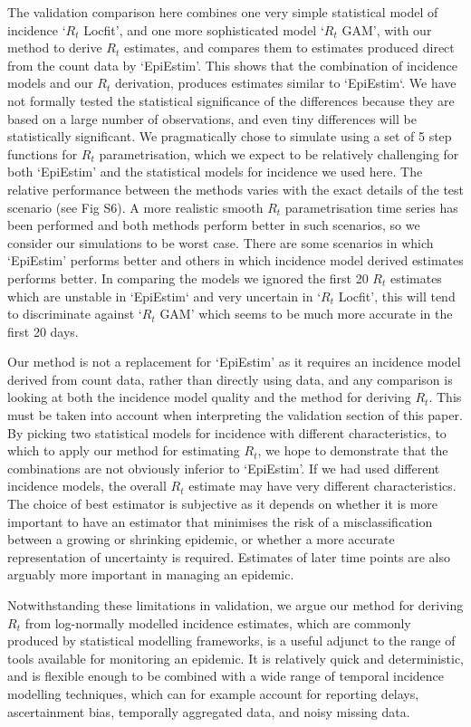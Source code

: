 \documentclass[10pt,letterpaper]{article}
\begin{document}
The validation comparison here combines one very simple statistical model of incidence `$R_t$ Locfit', and one more sophisticated model `$R_t$ GAM', with our method to derive $R_t$ estimates, and compares them to estimates produced direct from the count data by `EpiEstim'. This shows that the combination of incidence models and our $R_t$ derivation, produces estimates similar to `EpiEstim`. We have not formally tested the statistical significance of the differences because they are based on a large number of observations, and even tiny differences will be statistically significant. We pragmatically chose to simulate using a set of 5 step functions for $R_t$ parametrisation, which we expect to be relatively challenging for both `EpiEstim' and the statistical models for incidence we used here. The relative performance between the methods varies with the exact details of the test scenario (see  Fig S6). A more realistic smooth $R_t$ parametrisation time series has been performed and both methods perform better in such scenarios, so we consider our simulations to be worst case. There are some scenarios in which `EpiEstim' performs better and others in which incidence model derived estimates performs better. In comparing the models we ignored the first 20 $R_t$ estimates which are unstable in `EpiEstim` and very uncertain in `$R_t$ Locfit', this will tend to discriminate against `$R_t$ GAM' which seems to be much more accurate in the first 20 days.

Our method is not a replacement for `EpiEstim' as it requires an incidence model derived from count data, rather than directly using data, and any comparison is looking at both the incidence model quality and the method for deriving $R_t$. This must be taken into account when interpreting the validation section of this paper. By picking two statistical models for incidence with different characteristics, to which to apply our method for estimating $R_t$, we hope to demonstrate that the combinations are not obviously inferior to `EpiEstim'. If we had used different incidence models, the overall $R_t$ estimate may have very different characteristics. The choice of best estimator is subjective as it depends on whether it is more important to have an estimator that minimises the risk of a misclassification between a growing or shrinking epidemic, or whether a more accurate representation of uncertainty is required. Estimates of later time points are also arguably more important in managing an epidemic.

Notwithstanding these limitations in validation, we argue our method for deriving $R_t$ from log-normally modelled incidence estimates, which are commonly produced by statistical modelling frameworks, is a useful adjunct to the range of tools available for monitoring an epidemic. It is relatively quick and deterministic, and is flexible enough to be combined with a wide range of temporal incidence modelling techniques, which can for example account for reporting delays, ascertainment bias, temporally aggregated data, and noisy missing data. 
\end{document}
